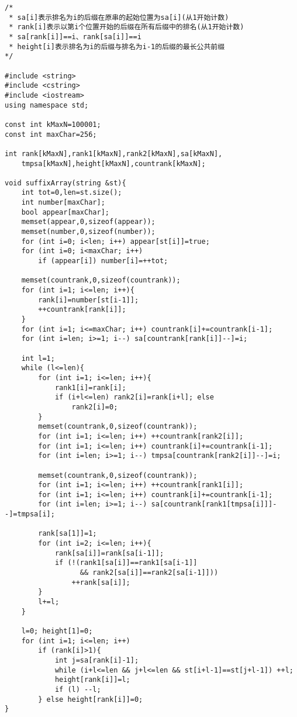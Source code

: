 \begin{verbatim}
/* 
 * sa[i]表示排名为i的后缀在原串的起始位置为sa[i](从1开始计数)
 * rank[i]表示以第i个位置开始的后缀在所有后缀中的排名(从1开始计数)
 * sa[rank[i]]==i、rank[sa[i]]==i
 * height[i]表示排名为i的后缀与排名为i-1的后缀的最长公共前缀
*/

#include <string>
#include <cstring>
#include <iostream>
using namespace std;

const int kMaxN=100001;
const int maxChar=256;

int rank[kMaxN],rank1[kMaxN],rank2[kMaxN],sa[kMaxN],
    tmpsa[kMaxN],height[kMaxN],countrank[kMaxN];

void suffixArray(string &st){
    int tot=0,len=st.size();
    int number[maxChar];
    bool appear[maxChar];
    memset(appear,0,sizeof(appear));
    memset(number,0,sizeof(number));
    for (int i=0; i<len; i++) appear[st[i]]=true;
    for (int i=0; i<maxChar; i++)
        if (appear[i]) number[i]=++tot;

    memset(countrank,0,sizeof(countrank));
    for (int i=1; i<=len; i++){
        rank[i]=number[st[i-1]];
        ++countrank[rank[i]];
    }
    for (int i=1; i<=maxChar; i++) countrank[i]+=countrank[i-1];
    for (int i=len; i>=1; i--) sa[countrank[rank[i]]--]=i;

    int l=1;
    while (l<=len){
        for (int i=1; i<=len; i++){
            rank1[i]=rank[i];
            if (i+l<=len) rank2[i]=rank[i+l]; else 
                rank2[i]=0;
        }
        memset(countrank,0,sizeof(countrank));
        for (int i=1; i<=len; i++) ++countrank[rank2[i]];
        for (int i=1; i<=len; i++) countrank[i]+=countrank[i-1];
        for (int i=len; i>=1; i--) tmpsa[countrank[rank2[i]]--]=i;

        memset(countrank,0,sizeof(countrank));
        for (int i=1; i<=len; i++) ++countrank[rank1[i]];
        for (int i=1; i<=len; i++) countrank[i]+=countrank[i-1];
        for (int i=len; i>=1; i--) sa[countrank[rank1[tmpsa[i]]]--]=tmpsa[i];

        rank[sa[1]]=1;
        for (int i=2; i<=len; i++){
            rank[sa[i]]=rank[sa[i-1]];
            if (!(rank1[sa[i]]==rank1[sa[i-1]] 
                  && rank2[sa[i]]==rank2[sa[i-1]]))
                ++rank[sa[i]];
        }
        l+=l;
    }

    l=0; height[1]=0;
    for (int i=1; i<=len; i++)
        if (rank[i]>1){
            int j=sa[rank[i]-1];
            while (i+l<=len && j+l<=len && st[i+l-1]==st[j+l-1]) ++l;
            height[rank[i]]=l;
            if (l) --l;
        } else height[rank[i]]=0;
}
\end{verbatim}
